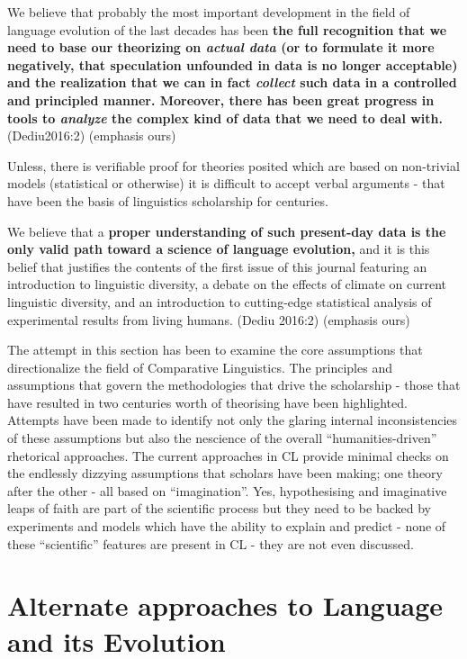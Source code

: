 \begin{myquote}
We believe that probably the most important development in the field of language evolution of the last decades has been \textbf{the full recognition that we need to base our theorizing on \textit{actual data} (or to formulate it more negatively, that speculation unfounded in data is no longer acceptable) and the realization that we can in fact \textit{collect} such data in a controlled and principled manner. Moreover, there has been great progress in tools to \textit{analyze} the complex kind of data that we need to deal with.} (Dediu2016:2) (emphasis ours)
\end{myquote}

Unless, there is verifiable proof for theories posited which are based on non-trivial models (statistical or otherwise) it is difficult to accept verbal arguments - that have been the basis of linguistics scholarship for centuries.

\begin{myquote}
We believe that a \textbf{proper understanding of such present-day data is the only valid path toward a science of language evolution,} and it is this belief that justifies the contents of the first issue of this journal featuring an introduction to linguistic diversity, a debate on the effects of climate on current linguistic diversity, and an introduction to cutting-edge statistical analysis of experimental results from living humans. (Dediu 2016:2) (emphasis ours)
\end{myquote}

The attempt in this section has been to examine the core assumptions that directionalize the field of Comparative Linguistics. The principles and assumptions that govern the methodologies that drive the scholarship - those that have resulted in two centuries worth of theorising have been highlighted. Attempts have been made to identify not only the glaring internal inconsistencies of these assumptions but also the nescience of the overall “humanities-driven” rhetorical approaches. The current approaches in CL provide minimal checks on the endlessly dizzying assumptions that scholars have been making; one theory after the other - all based on “imagination”. Yes, hypothesising and imaginative leaps of faith are part of the scientific process but they need to be backed by experiments and models which have the ability to explain and predict - none of these “scientific” features are present in CL - they are not even discussed.


\section*{Alternate approaches to Language and its Evolution}


